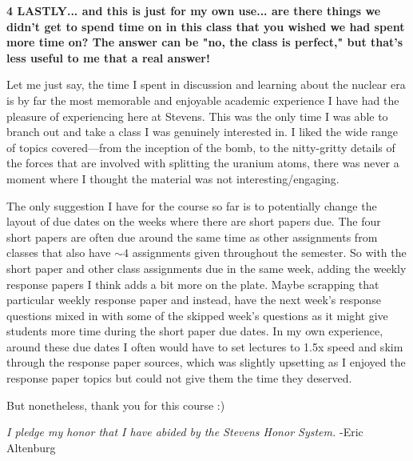 \documentclass[12pt]{turabian-researchpaper}
\newcommand\question[2]{\noindent\textbf{#1 \quad #2}}
\begin{document}
	

\question{4}{LASTLY... and this is just for my own use... are there things we didn't get to spend time on in this class that you wished we had spent more time on? The answer can be "no, the class is perfect," but that's less useful to me that a real answer!}

	Let me just say, the time I spent in discussion and learning about the nuclear era is by far the most memorable and enjoyable academic experience I have had the pleasure of experiencing here at Stevens. This was the only time I was able to branch out and take a class I was genuinely interested in. I liked the wide range of topics covered—from the inception of the bomb, to the nitty-gritty details of the forces that are involved with splitting the uranium atoms, there was never a moment where I thought the material was not interesting/engaging. 

	The only suggestion I have for the course so far is to potentially change the layout of due dates on the weeks where there are short papers due. The four short papers are often due around the same time as other assignments from classes that also have $\sim 4$ assignments given throughout the semester. So with the short paper and other class assignments due in the same week, adding the weekly response papers I think adds a bit more on the plate. Maybe scrapping that particular weekly response paper and instead, have the next week's response questions mixed in with some of the skipped week's questions as it might give students more time during the short paper due dates. In my own experience, around these due dates I often would have to set lectures to 1.5x speed and skim through the response paper sources, which was slightly upsetting as I enjoyed the response paper topics but could not give them the time they deserved.

	But nonetheless, thank you for this course :)


\vspace*{\fill}
\noindent\textit{I pledge my honor that I have abided by the Stevens Honor System.} -Eric Altenburg
\end{document}
